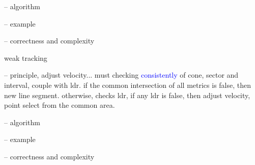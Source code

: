 -- algorithm

-- example

-- correctness and complexity

weak tracking

-- principle, adjust velocity...
	must checking \textcolor{blue}{consistently} of cone, sector and interval, couple with ldr.
	if the common intersection of all metrics is false, then new line segment.
	otherwise, checks ldr, 	if any ldr is false, then adjust velocity, point select from the common area.
	
-- algorithm

-- example

-- correctness and complexity
